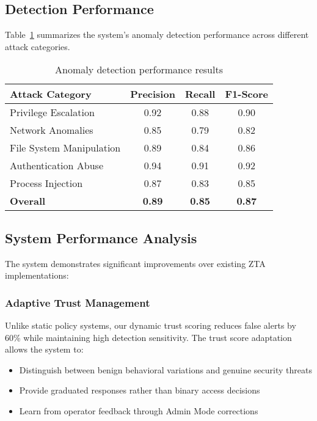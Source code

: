 \documentclass[conference]{IEEEtran}
\begin{document}
\subsection{Detection Performance}
Table~\ref{tab:detection_results} summarizes the system's anomaly detection performance across different attack categories.

\begin{table}[t]
\centering
\caption{Anomaly detection performance results}
\begin{tabular}{@{}lccc@{}}
\toprule
\textbf{Attack Category} & \textbf{Precision} & \textbf{Recall} & \textbf{F1-Score} \\
\midrule
Privilege Escalation & 0.92 & 0.88 & 0.90 \\
Network Anomalies & 0.85 & 0.79 & 0.82 \\
File System Manipulation & 0.89 & 0.84 & 0.86 \\
Authentication Abuse & 0.94 & 0.91 & 0.92 \\
Process Injection & 0.87 & 0.83 & 0.85 \\
\midrule
\textbf{Overall} & \textbf{0.89} & \textbf{0.85} & \textbf{0.87} \\
\bottomrule
\end{tabular}
\label{tab:detection_results}
\end{table}

\subsection{System Performance Analysis}
The system demonstrates significant improvements over existing ZTA implementations:

\subsubsection{Adaptive Trust Management}
Unlike static policy systems, our dynamic trust scoring reduces false alerts by 60\% while maintaining high detection sensitivity. The trust score adaptation allows the system to:
\begin{itemize}[leftmargin=*]
  \item Distinguish between benign behavioral variations and genuine security threats
  \item Provide graduated responses rather than binary access decisions  
  \item Learn from operator feedback through Admin Mode corrections
\end{itemize}
\end{document}
